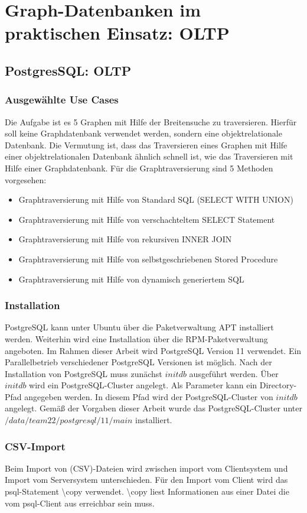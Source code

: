 \chapter{Graph-Datenbanken im praktischen Einsatz: OLTP}
\section{PostgresSQL: OLTP}
\subsection{Ausgewählte Use Cases}
Die Aufgabe ist es 5 Graphen mit Hilfe der Breitensuche zu traversieren. Hierfür soll keine Graphdatenbank verwendet werden, sondern eine objektrelationale Datenbank.
Die Vermutung ist, dass das Traversieren eines Graphen mit Hilfe einer objektrelationalen Datenbank ähnlich schnell ist, wie das Traversieren mit Hilfe einer Graphdatenbank.
Für die Graphtraversierung sind 5 Methoden vorgesehen:
\begin{itemize}
    \item Graphtraversierung mit Hilfe von Standard SQL (SELECT WITH UNION)
    \item Graphtraversierung mit Hilfe von verschachteltem SELECT Statement
    \item Graphtraversierung mit Hilfe von rekursiven INNER JOIN
    \item Graphtraversierung mit Hilfe von selbstgeschriebenen Stored Procedure
    \item Graphtraversierung mit Hilfe von dynamisch generiertem SQL
\end{itemize}
\subsection{Installation}
PostgreSQL kann unter Ubuntu über die Paketverwaltung APT installiert werden. Weiterhin wird eine Installation über die RPM-Paketverwaltung angeboten. Im Rahmen dieser Arbeit wird PostgreSQL Version 11 verwendet. Ein Parallelbetrieb verschiedener PostgreSQL Versionen ist möglich. 
Nach der Installation von PostgreSQL muss zunächst $initdb$ ausgeführt werden. Über $initdb$ wird ein PostgreSQL-Cluster angelegt. Als Parameter kann ein Directory-Pfad angegeben werden. In diesem Pfad wird der PostgreSQL-Cluster von $initdb$ angelegt.
Gemäß der Vorgaben dieser Arbeit wurde das PostgreSQL-Cluster unter $/data/team22/postgresql/11/main$ installiert.
\subsection{CSV-Import}
Beim Import von (CSV)-Dateien wird zwischen import vom Clientsystem und  Import vom Serversystem unterschieden. 
Für den Import vom Client wird das psql-Statement \textbackslash copy verwendet. \textbackslash copy liest Informationen aus einer Datei die vom psql-Client aus erreichbar sein muss. \cite{postgres2018}

